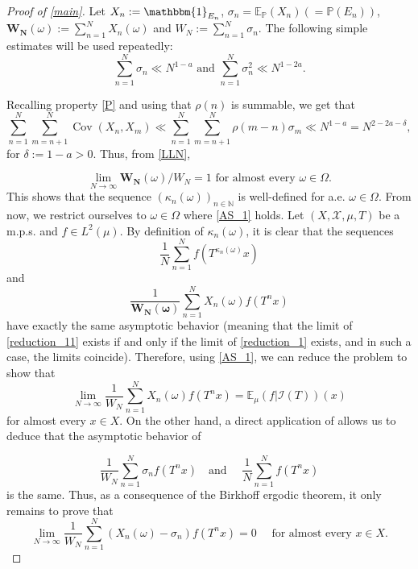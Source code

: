 \documentclass[11pt]{amsart}
\numberwithin{equation}{section}
\theoremstyle{definition}
\theoremstyle{plain}
\newcommand{\N}{{\mathbb N}}
\renewcommand{\P}{{\mathbb P}}
\newcommand{\Cov}{\operatorname{Cov}}
\begin{document}
\begin{proof}[Proof of \cref{main}] 
Let $X_n:=\mathbbm{1}_{E_n}$, $\sigma_n=\mathbb{E}_{\P}(X_n)(=\mathbb{P}(E_n))$, $\mathbf{W_N}(\omega):=\sum_{n=1}^N X_n(\omega)$ and $W_N:=\sum_{n=1}^N \sigma_n$. The following simple estimates will be used repeatedly:
 $$\sum_{n=1}^N\sigma_n\ll N^{1-a} \text{ and }  \sum_{n=1}^N\sigma_n^2\ll N^{1-2a}.$$


Recalling property \eqref{P} and using that $\rho(n)$ is summable, we get that
    \[\sum_{n=1}^N\sum_{m=n+1}^N\Cov(X_n,X_m)\ll \sum_{n=1}^N\sum_{m=n+1}^N \rho(m-n)\sigma_m\ll N^{1-a}= N^{2-2a-\delta},\]
    for $\delta:=1-a>0$. Thus, from \cref{LLN},

\begin{equation}
    \displaystyle\lim_{N\to \infty} \mathbf{W_N
}(\omega)/W_N=1\text{ for almost every $\omega\in\Omega$}.\label{AS_1}
\end{equation} This shows that the sequence $(\kappa_n(\omega))_{n\in\N}$ is well-defined for a.e. $\omega\in \Omega$. From now, we restrict ourselves to $\omega\in \Omega$ where \eqref{AS_1} holds. Let $(X,\mathcal{X},\mu,T)$ be a m.p.s. and $f\in L^2(\mu)$. By definition of $\kappa_n(\omega)$, it is clear that the sequences
\begin{equation} 
      \dfrac{1}{N}\sum_{n=1}^Nf(T^{\kappa_n(\omega)}x)\label{reduction_11}
  \end{equation}
  and    
    \begin{equation} 
      \dfrac{1}{\mathbf{W_N(\omega)}}\sum_{n=1}^NX_n(\omega)f(T^nx)\label{reduction_1}
  \end{equation} 
have exactly the same asymptotic behavior (meaning that the limit of  \eqref{reduction_11} exists if and only if the limit of \eqref{reduction_1} exists, and in such a case, the limits coincide).
Therefore, using \eqref{AS_1}, we can reduce the problem to show that \begin{equation}
    \lim_{N\to\infty}\dfrac{1}{W_N}\sum_{n=1}^NX_n(\omega)f(T^nx)=\mathbb{E}_{\mu}(f|\mathcal{I}(T))(x)\label{eqn:main1}
  \end{equation}
  for almost every $x\in X$. On the other hand, a direct application of \cite[Lemma A.3]{Frantzikinakis_Lesigne_Wierdl} allows us to deduce that the asymptotic behavior of
  
  \[\dfrac{1}{W_N}\sum_{n=1}^N\sigma_nf(T^nx)\quad \text{and }\quad \dfrac{1}{N}\sum_{n=1}^Nf(T^nx)\]
  is the same. Thus, as a consequence of the Birkhoff ergodic theorem, it only remains to prove that
  \begin{equation}
      \lim_{N\to\infty}\dfrac{1}{W_N}\sum_{n=1}^N(X_n(\omega)-\sigma_n)f(T^nx)=0 \quad \text{ for almost every $x\in X$.}\label{eqn:main2}
  \end{equation}
  

\end{proof}
\end{document}
